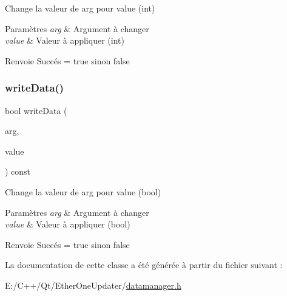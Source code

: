 Change la valeur de arg pour value (int) 


\begin{DoxyParams}{Paramètres}
{\em arg} & Argument à changer \\
\hline
{\em value} & Valeur à appliquer (int) \\
\hline
\end{DoxyParams}
\begin{DoxyReturn}{Renvoie}
Succés = true sinon false 
\end{DoxyReturn}
\mbox{\label{classDataManager_ab2cc4cd3515c1947b59a275f8851c2a5}} 
\subsubsection{\texorpdfstring{write\+Data()}{writeData()}\hspace{0.1cm}{\footnotesize\ttfamily [3/3]}}
{\footnotesize\ttfamily bool write\+Data (\begin{DoxyParamCaption}\item[{const Q\+String}]{arg,  }\item[{const bool}]{value }\end{DoxyParamCaption}) const\hspace{0.3cm}{\ttfamily [inline]}}



Change la valeur de arg pour value (bool) 


\begin{DoxyParams}{Paramètres}
{\em arg} & Argument à changer \\
\hline
{\em value} & Valeur à appliquer (bool) \\
\hline
\end{DoxyParams}
\begin{DoxyReturn}{Renvoie}
Succés = true sinon false 
\end{DoxyReturn}


La documentation de cette classe a été générée à partir du fichier suivant \+:\begin{DoxyCompactItemize}
\item 
E\+:/\+C++/\+Qt/\+Ether\+One\+Updater/\hyperlink{datamanager_8h}{datamanager.\+h}\end{DoxyCompactItemize}
